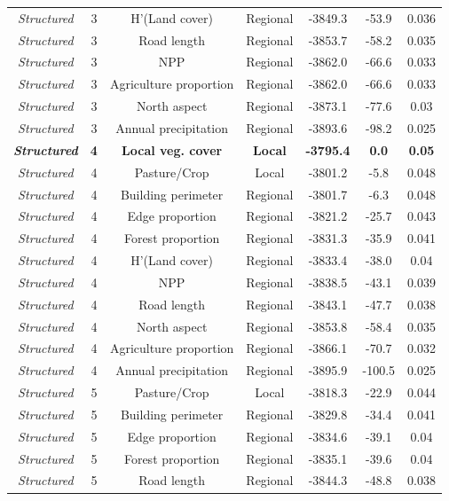 \documentclass[preprint,final,times,12pt,3p]{elsarticle}
\begin{document}
\begin{longtable}{ c c c c c c c}
	\emph{Structured} & 3 & H'(Land cover) & Regional & -3849.3 & -53.9 & 0.036 \\
	\emph{Structured} & 3 & Road length & Regional & -3853.7 & -58.2 & 0.035 \\
	\emph{Structured} & 3 & NPP & Regional & -3862.0 & -66.6 & 0.033 \\
	\emph{Structured} & 3 & Agriculture proportion & Regional & -3862.0 & -66.6 & 0.033 \\
	\emph{Structured} & 3 & North aspect & Regional & -3873.1 & -77.6 & 0.03 \\
	\emph{Structured} & 3 & Annual precipitation & Regional & -3893.6 & -98.2 & 0.025 \\
	\textbf{\emph{Structured}} & \textbf{4} & \textbf{Local veg. cover} & \textbf{Local} & \textbf{-3795.4} & \textbf{0.0} & \textbf{0.05} \\
	\emph{Structured} & 4 & Pasture/Crop & Local & -3801.2 & -5.8 & 0.048 \\
	\emph{Structured} & 4 & Building perimeter & Regional & -3801.7 & -6.3 & 0.048 \\
	\emph{Structured} & 4 & Edge proportion & Regional & -3821.2 & -25.7 & 0.043 \\
	\emph{Structured} & 4 & Forest proportion & Regional & -3831.3 & -35.9 & 0.041 \\
	\emph{Structured} & 4 & H'(Land cover) & Regional & -3833.4 & -38.0 & 0.04 \\
	\emph{Structured} & 4 & NPP & Regional & -3838.5 & -43.1 & 0.039 \\
	\emph{Structured} & 4 & Road length & Regional & -3843.1 & -47.7 & 0.038 \\
	\emph{Structured} & 4 & North aspect & Regional & -3853.8 & -58.4 & 0.035 \\
	\emph{Structured} & 4 & Agriculture proportion & Regional & -3866.1 & -70.7 & 0.032 \\
	\emph{Structured} & 4 & Annual precipitation & Regional & -3895.9 & -100.5 & 0.025 \\
	﻿\emph{Structured} & 5 & Pasture/Crop & Local & -3818.3 & -22.9 & 0.044 \\
	\emph{Structured} & 5 & Building perimeter & Regional & -3829.8 & -34.4 & 0.041 \\
	\emph{Structured} & 5 & Edge proportion & Regional & -3834.6 & -39.1 & 0.04 \\
	\emph{Structured} & 5 & Forest proportion & Regional & -3835.1 & -39.6 & 0.04 \\
	\emph{Structured} & 5 & Road length & Regional & -3844.3 & -48.8 & 0.038 \\

\end{longtable}
\end{document}
